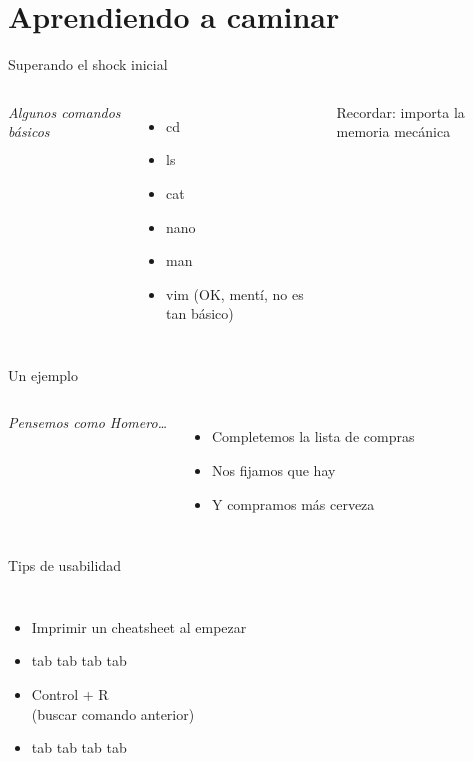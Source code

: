 \section{Aprendiendo a caminar}


\begin{frame}{Superando el shock inicial}
\begin{columns}[onlytextwidth]
	\textit{ Algunos comandos b\'asicos }
	\begin{itemize}
		\item cd
		\item ls
		\item cat
		\item nano
		\item man
		\item vim (OK, ment\'i, no es tan b\'asico)
	\end{itemize}
	\bigskip
	\alert{ Recordar: importa la memoria mec\'anica }
\end{columns}
\end{frame}


\begin{frame}{ Un ejemplo }
\begin{columns}[onlytextwidth]
	\textit{ Pensemos como Homero\ldots }
	\only<1> {
		\begin{itemize}
			\item Completemos la lista de compras
			\item Nos fijamos que hay
			\item Y compramos m\'as cerveza
		\end{itemize}
	} {
		
	}
\end{columns}
\end{frame}



\begin{frame}{Tips de usabilidad}
\begin{columns}[onlytextwidth]
	\begin{itemize}
		\item Imprimir un cheatsheet al empezar
		\item tab tab tab tab
		\item Control + R \\ (buscar comando anterior)
		\item tab tab tab tab
	\end{itemize}
\end{columns}
\end{frame}


